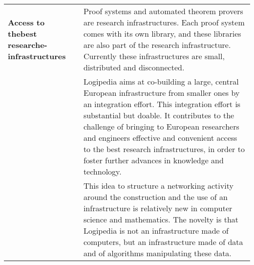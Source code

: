 \begin{longtable}{|p{}|p{}|}
\hline
{\bf Access to the\newline best research\newline e-infrastructures}
&
Proof systems and automated theorem provers are research
infrastructures. Each proof system comes with its own library, and
these libraries are also part of the research infrastructure.  Currently
these infrastructures are small, distributed and disconnected.\\
&
\hspace{0.4cm} Logipedia aims at co-building a large, central European
infrastructure from smaller ones by an integration effort.  This
integration effort is substantial but doable. It contributes to the
challenge of bringing to European researchers and engineers effective
and convenient access to the best research infrastructures, in order
to foster further advances in knowledge and technology.
\\
&
\hspace{0.4cm} This idea to structure a networking activity around the
construction and the use of an infrastructure is relatively new in
computer science and mathematics. The novelty is that Logipedia is not
an infrastructure made of computers, but an infrastructure made of
data and of algorithms manipulating these data.
\\
\hline


\end{longtable}
